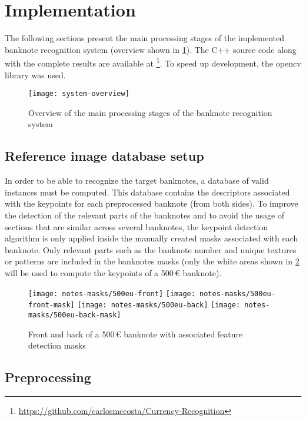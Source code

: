\section{Implementation}\label{sec:implementation}

The following sections present the main processing stages of the implemented banknote recognition system (overview shown in \cref{fig:system-overview}). The C++ source code along with the complete results are available at \footnote{\url{https://github.com/carlosmccosta/Currency-Recognition}}. To speed up development, the \gls{opencv} library was used.

\begin{figure}[!ht]
	\centering
	\texttt{[image: system-overview]}
	\caption{Overview of the main processing stages of the banknote recognition system}
	\label{fig:system-overview}
\end{figure}


\subsection{Reference image database setup}

In order to be able to recognize the target banknotes, a database of valid instances must be computed. This database contains the descriptors associated with the keypoints for each preprocessed banknote (from both sides). To improve the detection of the relevant parts of the banknotes and to avoid the usage of sections that are similar across several banknotes, the keypoint detection algorithm is only applied inside the manually created masks associated with each banknote. Only relevant parts such as the banknote number and unique textures or patterns are included in the banknotes masks (only the white areas shown in \cref{fig:banknote-feature-detection-mask-500-front} will be used to compute the keypoints of a 500\,\euro{} banknote).


\begin{figure}[H]
	\centering
	\texttt{[image: notes-masks/500eu-front]}
	\texttt{[image: notes-masks/500eu-front-mask]}
	\texttt{[image: notes-masks/500eu-back]}
	\texttt{[image: notes-masks/500eu-back-mask]}
	\caption{Front and back of a 500\,\euro{} banknote with associated feature detection masks}
	\label{fig:banknote-feature-detection-mask-500-front}
\end{figure}


\subsection{Preprocessing}

